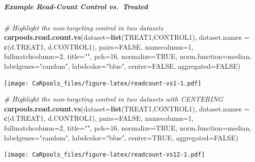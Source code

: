 \documentclass[]{article}
\newenvironment{Shaded}{\begin{snugshade}}{\end{snugshade}}
\newcommand{\KeywordTok}[1]{\textcolor[rgb]{0.13,0.29,0.53}{\textbf{{#1}}}}
\newcommand{\DataTypeTok}[1]{\textcolor[rgb]{0.13,0.29,0.53}{{#1}}}
\newcommand{\DecValTok}[1]{\textcolor[rgb]{0.00,0.00,0.81}{{#1}}}
\newcommand{\StringTok}[1]{\textcolor[rgb]{0.31,0.60,0.02}{{#1}}}
\newcommand{\CommentTok}[1]{\textcolor[rgb]{0.56,0.35,0.01}{\textit{{#1}}}}
\newcommand{\OtherTok}[1]{\textcolor[rgb]{0.56,0.35,0.01}{{#1}}}
\newcommand{\NormalTok}[1]{{#1}}
\let\oldsubparagraph\subparagraph
\renewcommand{\subparagraph}[1]{\oldsubparagraph{#1}\mbox{}}
\begin{document}
\subparagraph{Example Read-Count Control
vs.~Treated}\label{example-read-count-control-vs.treated}

\begin{Shaded}
\begin{Highlighting}[]
\CommentTok{# Highlight the non-targeting control in two datasets}
\KeywordTok{carpools.read.count.vs}\NormalTok{(}\DataTypeTok{dataset=}\KeywordTok{list}\NormalTok{(TREAT1,CONTROL1), }\DataTypeTok{dataset.names =} \KeywordTok{c}\NormalTok{(d.TREAT1, d.CONTROL1),}
  \DataTypeTok{pairs=}\OtherTok{FALSE}\NormalTok{, }\DataTypeTok{namecolumn=}\DecValTok{1}\NormalTok{, }\DataTypeTok{fullmatchcolumn=}\DecValTok{2}\NormalTok{, }\DataTypeTok{title=}\StringTok{""}\NormalTok{, }\DataTypeTok{pch=}\DecValTok{16}\NormalTok{,}
  \DataTypeTok{normalize=}\OtherTok{TRUE}\NormalTok{, }\DataTypeTok{norm.function=}\NormalTok{median, }\DataTypeTok{labelgenes=}\StringTok{"random"}\NormalTok{, }\DataTypeTok{labelcolor=}\StringTok{"blue"}\NormalTok{,}
  \DataTypeTok{center=}\OtherTok{FALSE}\NormalTok{, }\DataTypeTok{aggregated=}\OtherTok{FALSE}\NormalTok{)}
\end{Highlighting}
\end{Shaded}

\texttt{[image: CaRpools\_files/figure-latex/readcount-vs1-1.pdf]}

\begin{Shaded}
\begin{Highlighting}[]
\CommentTok{# Highlight the non-targeting control in two datasets with CENTERING}
\KeywordTok{carpools.read.count.vs}\NormalTok{(}\DataTypeTok{dataset=}\KeywordTok{list}\NormalTok{(TREAT1,CONTROL1), }\DataTypeTok{dataset.names =} \KeywordTok{c}\NormalTok{(d.TREAT1, d.CONTROL1),}
  \DataTypeTok{pairs=}\OtherTok{FALSE}\NormalTok{, }\DataTypeTok{namecolumn=}\DecValTok{1}\NormalTok{, }\DataTypeTok{fullmatchcolumn=}\DecValTok{2}\NormalTok{, }\DataTypeTok{title=}\StringTok{""}\NormalTok{, }\DataTypeTok{pch=}\DecValTok{16}\NormalTok{,}
  \DataTypeTok{normalize=}\OtherTok{TRUE}\NormalTok{, }\DataTypeTok{norm.function=}\NormalTok{median, }\DataTypeTok{labelgenes=}\StringTok{"random"}\NormalTok{, }\DataTypeTok{labelcolor=}\StringTok{"blue"}\NormalTok{,}
  \DataTypeTok{center=}\OtherTok{TRUE}\NormalTok{, }\DataTypeTok{aggregated=}\OtherTok{FALSE}\NormalTok{)}
\end{Highlighting}
\end{Shaded}

\texttt{[image: CaRpools\_files/figure-latex/readcount-vs12-1.pdf]}
\end{document}
